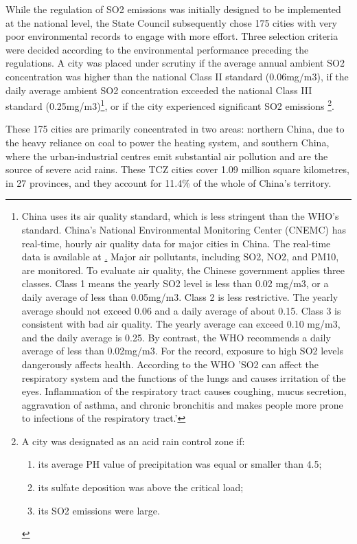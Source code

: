 \documentclass[12pt]{article}
\begin{document}
While the regulation of SO2 emissions was initially designed to be implemented at the national level, the State Council subsequently chose 175 cities with very poor environmental records to engage with more effort. Three selection criteria were decided according to the environmental performance preceding the regulations. A city was placed under scrutiny if the average annual ambient SO2 concentration was higher than the national Class II standard (0.06mg/m3), if the daily average ambient SO2 concentration exceeded the national Class III standard (0.25mg/m3)\footnote{China uses its air quality standard, which is less stringent than the WHO's standard. China's National Environmental Monitoring Center (CNEMC) has real-time, hourly air quality data for major cities in China. The real-time data is available at \href{http://www.cnemc.cn/}. Major air pollutants, including SO2, NO2, and PM10, are monitored. To evaluate air quality, the Chinese government applies three classes. Class 1 means the yearly SO2 level is less than 0.02 mg/m3, or a daily average of less than 0.05mg/m3. Class 2 is less restrictive. The yearly average should not exceed 0.06 and a daily average of about 0.15. Class 3 is consistent with bad air quality. The yearly average can exceed 0.10 mg/m3, and the daily average is 0.25. By contrast, the WHO recommends a daily average of less than 0.02mg/m3. For the record, exposure to high SO2 levels dangerously affects health. According to the WHO 'SO2 can affect the respiratory system and the functions of the lungs and causes irritation of the eyes. Inflammation of the respiratory tract causes coughing, mucus secretion, aggravation of asthma, and chronic bronchitis and makes people more prone to infections of the respiratory tract.'}, or if the city experienced significant SO2 emissions \footnote{A city was designated as an acid rain control zone if:
\begin{enumerate}
\item its average PH value of precipitation was equal or smaller than 4.5;
\item its sulfate deposition was above the critical load;
\item its SO2 emissions were large.
\end{enumerate}
}. 

These 175 cities are primarily concentrated in two areas: northern China, due to the heavy reliance on coal to power the heating system, and southern China, where the urban-industrial centres emit substantial air pollution and are the source of severe acid rains. These TCZ cities cover 1.09 million square kilometres, in 27 provinces, and they account for 11.4\% of the whole of China's territory.
\end{document}
